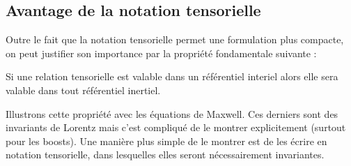 \subsection{Avantage de la notation tensorielle}
Outre le fait que la notation tensorielle permet une formulation plus compacte, on peut justifier son importance par la propriété fondamentale suivante :
\begin{theoremframe}
    \begin{propri}
        Si une relation tensorielle est valable dans un référentiel interiel alors elle sera valable dans tout référentiel inertiel.
    \end{propri}
\end{theoremframe}
Illustrons cette propriété avec les équations de Maxwell. Ces derniers sont des invariants de Lorentz mais c'est compliqué de le montrer explicitement (surtout pour les boosts). Une manière plus simple de le montrer est de les écrire en notation tensorielle, dans lesquelles elles seront nécessairement invariantes.

